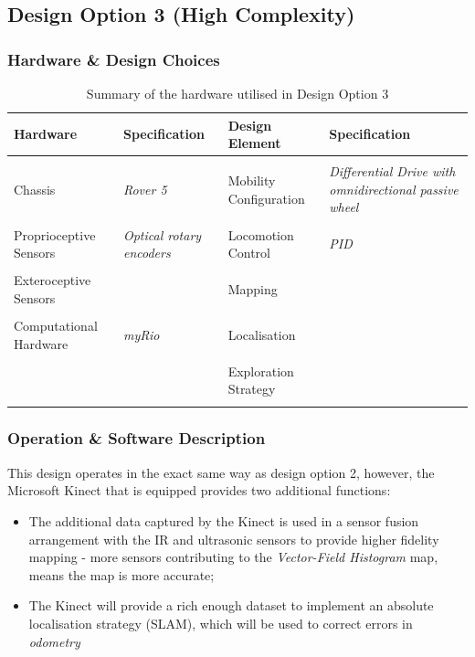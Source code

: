 \documentclass[a4paper]{article}
\begin{document}
\subsection{Design Option 3 (High Complexity)}
\subsubsection{Hardware \& Design Choices}
\begin{table}[h]
\centering
\caption{Summary of the hardware utilised in Design Option 3}\footnotesize
\begin{tabular}{p{3.5cm}p{3.8cm}p{3.5cm}p{3.8cm}}
\toprule
\textbf{Hardware} & \textbf{Specification} & \textbf{Design Element} & \textbf{Specification}\\
\midrule
& & &\\
Chassis  & \textit{Rover 5} & Mobility Configuration & \textit{Differential Drive with omnidirectional passive wheel}\\
& & &\\
Proprioceptive Sensors & \textit{Optical rotary encoders} & Locomotion Control & \textit{PID}\\
& & &\\
Exteroceptive Sensors & & Mapping &\\
& & & \\
Computational Hardware & \textit{myRio} & Localisation & \\
& & & \\
 & & Exploration Strategy &\\
& & & \\
\bottomrule
\end{tabular}
\end{table}

\subsubsection{Operation \& Software Description}
This design operates in the exact same way as design option 2, however, the Microsoft Kinect that is equipped provides two additional functions:
\begin{itemize}
\item The additional data captured by the Kinect is used in a sensor fusion arrangement with the IR and ultrasonic sensors to provide higher fidelity mapping - more sensors contributing to the \textit{Vector-Field Histogram} map, means the map is more accurate;
\item The Kinect will provide a rich enough dataset to implement an absolute localisation strategy (SLAM), which will be used to correct errors in \textit{odometry}
\end{itemize}
\end{document}
